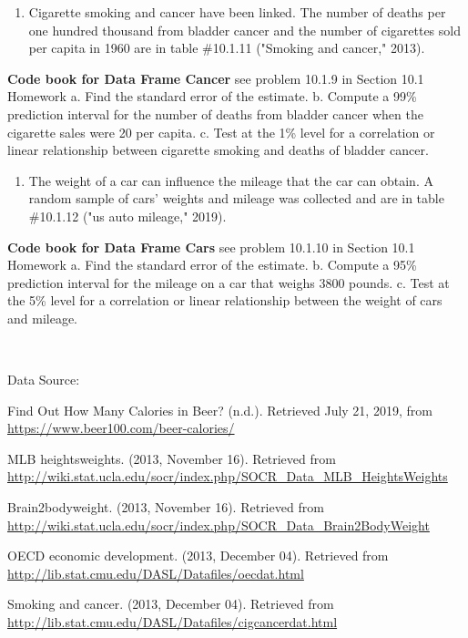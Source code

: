 \documentclass[]{book}
\providecommand{\tightlist}{%
  \setlength{\itemsep}{0pt}\setlength{\parskip}{0pt}}
\begin{document}
\begin{enumerate}
\def\labelenumi{\arabic{enumi}.}
\setcounter{enumi}{8}
\tightlist
\item
  Cigarette smoking and cancer have been linked. The number of deaths per one hundred thousand from bladder cancer and the number of cigarettes sold per capita in 1960 are in table \#10.1.11 ("Smoking and cancer," 2013).
\end{enumerate}

\textbf{Code book for Data Frame Cancer} see problem 10.1.9 in Section 10.1 Homework
a. Find the standard error of the estimate.
b. Compute a 99\% prediction interval for the number of deaths from bladder cancer when the cigarette sales were 20 per capita.
c. Test at the 1\% level for a correlation or linear relationship between cigarette smoking and deaths of bladder cancer.

\begin{enumerate}
\def\labelenumi{\arabic{enumi}.}
\setcounter{enumi}{9}
\tightlist
\item
  The weight of a car can influence the mileage that the car can obtain. A random sample of cars' weights and mileage was collected and are in table \#10.1.12 ("us auto mileage," 2019).
\end{enumerate}

\textbf{Code book for Data Frame Cars} see problem 10.1.10 in Section 10.1 Homework
a. Find the standard error of the estimate.
b. Compute a 95\% prediction interval for the mileage on a car that weighs 3800 pounds.
c. Test at the 5\% level for a correlation or linear relationship between the weight of cars and mileage.

\textbf{\\
}

Data Source:

Find Out How Many Calories in Beer? (n.d.). Retrieved July 21, 2019, from \url{https://www.beer100.com/beer-calories/}

MLB heightsweights. (2013, November 16). Retrieved from
\url{http://wiki.stat.ucla.edu/socr/index.php/SOCR_Data_MLB_HeightsWeights}

Brain2bodyweight. (2013, November 16). Retrieved from
\url{http://wiki.stat.ucla.edu/socr/index.php/SOCR_Data_Brain2BodyWeight}

OECD economic development. (2013, December 04). Retrieved from
\url{http://lib.stat.cmu.edu/DASL/Datafiles/oecdat.html}

Smoking and cancer. (2013, December 04). Retrieved from
\url{http://lib.stat.cmu.edu/DASL/Datafiles/cigcancerdat.html}
\end{document}
